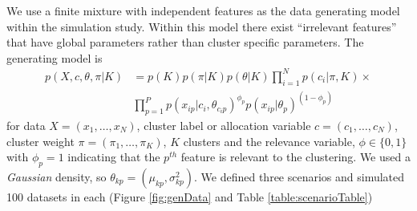 \documentclass{bioinfo}
\begin{document}
We use a finite mixture with independent features as the data generating model within the simulation study.
Within this model there exist ``irrelevant features'' \citep{law2003feature} that have global parameters rather than cluster specific parameters. 
The generating model is
\begin{align*}
	p(X, c, \theta, \pi| K) &= p(K) p(\pi| K) p(\theta|K) \prod_{i=1}^N p (c_i | \pi, K)  \times \\
	& \prod_{p=1}^P p(x_{ip} | c_i, \theta_{c_ip})^ {\phi_p} p(x_{ip} | \theta_p) ^ {(1 - \phi_p)}
\end{align*}
for data $X=(x_1, \ldots, x_N)$, cluster label or allocation variable $c=(c_1, \ldots, c_N)$, cluster weight $\pi=(\pi_1, \ldots, \pi_K)$, $K$ clusters and the relevance variable, $\phi \in \{0, 1\}$ with $\phi_p=1$ indicating that the $p^{th}$ feature is relevant to the clustering. We used a \emph{Gaussian} density, so $\theta_{kp} = (\mu_{kp}, \sigma^2_{kp})$. We defined three scenarios and simulated 100 datasets in each (Figure \ref{fig:genData} and Table \ref{table:scenarioTable}) 
\end{document}
